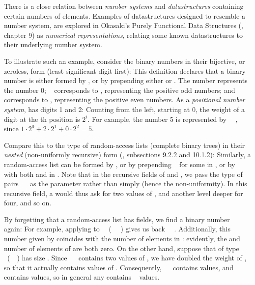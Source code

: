 There is a close relation between \emph{number systems} and \emph{datastructures} containing certain numbers of elements. Examples of datastructures designed to resemble a number system, are explored in Okasaki's Purely Functional Data Structures (\cite{purelyfunctional}, chapter 9) as \emph{numerical representations}, relating some known datastructures to their underlying number system.

To illustrate such an example, consider the binary numbers in their bijective, or zeroless, form (least significant digit first):
This definition declares that a binary number is either formed by , or by prepending either  or . The number  represents the number 0; \  corresponds to , representing the positive odd numbers; and  corresponds to , representing the positive even numbers. As a \emph{positional number system},  has digits 1 and 2: Counting from the left, starting at 0, the weight of a digit at the th position is $2^i$. For example, the number 5 is represented by \ \ , since $1 \cdot 2^0 + 2 \cdot 2^1 + 0 \cdot 2^2 = 5$.

Compare this to the type of random-access lists (complete binary trees) in their \emph{nested} (non-uniformly recursive) form (\cite{purelyfunctional}, subsections 9.2.2 and 10.1.2):
Similarly, a random-access list can be formed by , or by prepending \  for some  in , or by \ \  with both  and  in . Note that in the recursive fields of  and , we pass the type of pairs \ \  as the parameter rather than simply  (hence the non-uniformity). In this recursive field, a  would thus ask for two values of , and another level deeper for four, and so on.

By forgetting that a random-access list  has fields, we find a binary number \  again:
For example, applying  to \ \AV{\_}\ (\ \AV{\_}\ \AV{\_} ) gives us back \ \ . Additionally, this number given by  coincides with the number of elements in : evidently, the  and number of elements of  are both zero. On the other hand, suppose that  of type \ (\ \ ) has size . Since \ \  contains two values of , we have doubled the weight of , so that it actually contains  values of . Consequently, \ \  contains  values, and \ \ \  contains  values, so in general any  contains \  values.

